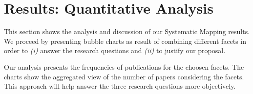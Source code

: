 \section{Results: Quantitative Analysis}\label{sec:qanalysis}

This section shows the analysis and discussion of our Systematic Mapping results.
We proceed by presenting bubble charts as result of combining different facets in order to 
\textit{(i)} answer the research questions and \textit{(ii)} to justify our proposal.

% 


Our analysis presents the frequencies of publications for
the choosen facets. The charts show the aggregated view of the number of papers 
considering the facets. This approach will help answer the three research
questions more objectively.


% 
% 

